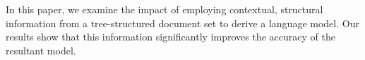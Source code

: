 In this paper, we examine the impact of employing contextual, structural information from a tree-structured document set to derive a language model. Our results show that this information significantly improves the accuracy of the resultant model.
